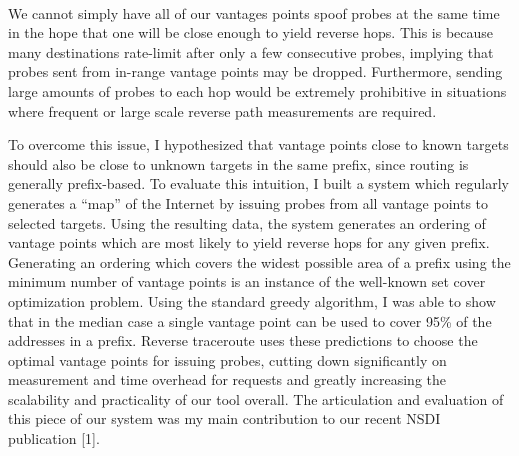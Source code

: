 \documentclass[12pt]{article}	%
\begin{document}
 \\
\indent We cannot simply have all of our vantages points spoof probes
at the same time in the hope that one will be close enough to yield reverse
hops. This is because many destinations rate-limit after only a few consecutive probes,
implying that probes sent from in-range vantage points may be dropped.
Furthermore, sending large amounts of probes to each hop would be extremely
prohibitive in situations where frequent or large scale reverse path
measurements are required.

To overcome this issue, I hypothesized that
vantage points close to known targets should also be close
to unknown targets in the same prefix, since routing is generally
prefix-based. To evaluate this intuition, I built a
system which regularly generates a ``map'' of the Internet by issuing 
probes from all vantage points to selected targets. Using the
resulting data, the system generates an ordering of vantage points which are
most likely to yield reverse hops for any
given prefix. Generating an ordering which covers the widest possible area of
a prefix using the minimum number of vantage points is an instance of the well-known
set cover optimization problem. Using the standard greedy algorithm, I was able to show that   
in the median case a single vantage point can be used to cover 95\% of the
addresses in a prefix. Reverse traceroute uses these predictions to choose the
optimal vantage points for issuing probes, cutting down significantly on measurement
and time overhead for requests and greatly
increasing the scalability and practicality of our tool overall. The
articulation and evaluation of this piece of our system was my main
contribution to our recent NSDI publication [1]. 
\end{document}
